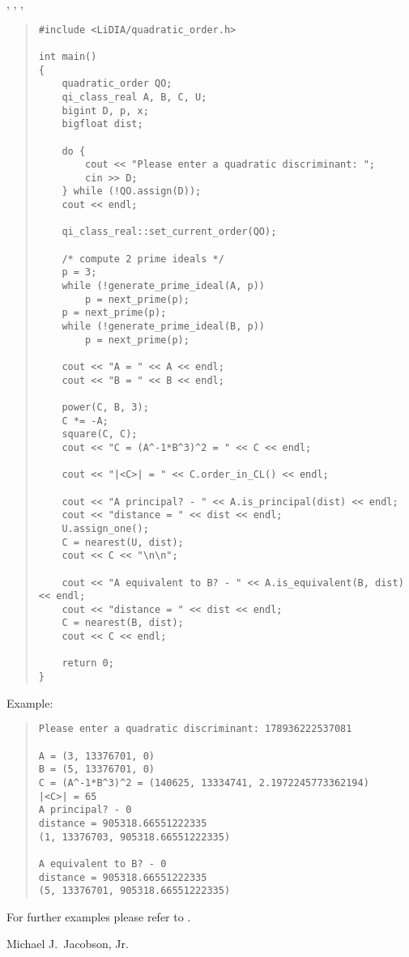 
\SEEALSO

,
,
,









\EXAMPLES

\begin{quote}
\begin{verbatim}
#include <LiDIA/quadratic_order.h>

int main()
{
    quadratic_order QO;
    qi_class_real A, B, C, U;
    bigint D, p, x;
    bigfloat dist;

    do {
        cout << "Please enter a quadratic discriminant: ";
        cin >> D;
    } while (!QO.assign(D));
    cout << endl;

    qi_class_real::set_current_order(QO);

    /* compute 2 prime ideals */
    p = 3;
    while (!generate_prime_ideal(A, p))
        p = next_prime(p);
    p = next_prime(p);
    while (!generate_prime_ideal(B, p))
        p = next_prime(p);

    cout << "A = " << A << endl;
    cout << "B = " << B << endl;

    power(C, B, 3);
    C *= -A;
    square(C, C);
    cout << "C = (A^-1*B^3)^2 = " << C << endl;

    cout << "|<C>| = " << C.order_in_CL() << endl;

    cout << "A principal? - " << A.is_principal(dist) << endl;
    cout << "distance = " << dist << endl;
    U.assign_one();
    C = nearest(U, dist);
    cout << C << "\n\n";

    cout << "A equivalent to B? - " << A.is_equivalent(B, dist) << endl;
    cout << "distance = " << dist << endl;
    C = nearest(B, dist);
    cout << C << endl;

    return 0;
}
\end{verbatim}
\end{quote}

Example:
\begin{quote}
\begin{verbatim}
Please enter a quadratic discriminant: 178936222537081

A = (3, 13376701, 0)
B = (5, 13376701, 0)
C = (A^-1*B^3)^2 = (140625, 13334741, 2.1972245773362194)
|<C>| = 65
A principal? - 0
distance = 905318.66551222335
(1, 13376703, 905318.66551222335)

A equivalent to B? - 0
distance = 905318.66551222335
(5, 13376701, 905318.66551222335)
\end{verbatim}
\end{quote}

For further examples please refer to
.



\AUTHOR

Michael J.~Jacobson, Jr.
